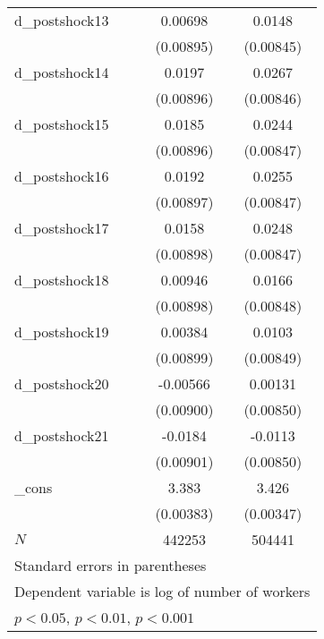 {\begin{tabular}{l*{2}{c}}
d\_postshock13&  0.00698         &   0.0148         \\
          &(0.00895)         &(0.00845)         \\
d\_postshock14&   0.0197\sym{*}  &   0.0267\sym{**} \\
          &(0.00896)         &(0.00846)         \\
d\_postshock15&   0.0185\sym{*}  &   0.0244\sym{**} \\
          &(0.00896)         &(0.00847)         \\
d\_postshock16&   0.0192\sym{*}  &   0.0255\sym{**} \\
          &(0.00897)         &(0.00847)         \\
d\_postshock17&   0.0158         &   0.0248\sym{**} \\
          &(0.00898)         &(0.00847)         \\
d\_postshock18&  0.00946         &   0.0166         \\
          &(0.00898)         &(0.00848)         \\
d\_postshock19&  0.00384         &   0.0103         \\
          &(0.00899)         &(0.00849)         \\
d\_postshock20& -0.00566         &  0.00131         \\
          &(0.00900)         &(0.00850)         \\
d\_postshock21&  -0.0184\sym{*}  &  -0.0113         \\
          &(0.00901)         &(0.00850)         \\
\_cons    &    3.383\sym{***}&    3.426\sym{***}\\
          &(0.00383)         &(0.00347)         \\
\hline
\(N\)     &   442253         &   504441         \\
\hline\hline
\multicolumn{3}{l}{\footnotesize Standard errors in parentheses}\\
\multicolumn{3}{l}{\footnotesize Dependent variable is log of number of workers}\\
\multicolumn{3}{l}{\footnotesize \sym{*} \(p<0.05\), \sym{**} \(p<0.01\), \sym{***} \(p<0.001\)}\\
\end{tabular}
}

